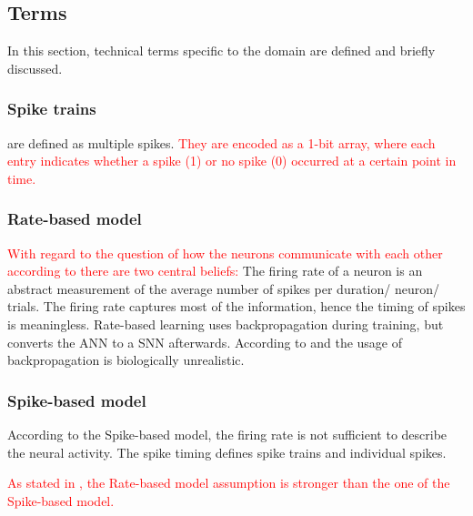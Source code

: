 \newcommand\rbModel{Rate-based model}
\newcommand\sbModel{Spike-based model}
\subsection{Terms}
\label{subsec:terms}

In this section, technical terms specific to the domain are defined and briefly discussed.

\subsubsection{Spike trains}
are defined as multiple spikes.
\textcolor{red}{
They are encoded as a 1-bit array, where each entry indicates whether a spike (1) or no spike (0) occurred at a certain point in time.
}

\subsubsection{\rbModel{}}
\textcolor{red}{With regard to the question of how the neurons communicate with each other according to \cite{spike_vs_rate} there are two central beliefs:}
The firing rate of a neuron is an abstract measurement of the average number of spikes per duration/ neuron/ trials.
The firing rate captures most of the information, hence the timing of spikes is meaningless.
Rate-based learning uses backpropagation during training, but converts the \ac{ANN} to a \ac{SNN} afterwards. 
According to \cite{SNN} and \cite{STDP_like} the usage of backpropagation is biologically unrealistic.

\subsubsection{\sbModel{}}
According to the \sbModel{}, the firing rate is not sufficient to describe the neural activity.
The spike timing defines spike trains and individual spikes.

\textcolor{red}{As stated in \cite{spike_vs_rate}, the \rbModel{} assumption is stronger than the one of the \sbModel{}.}
